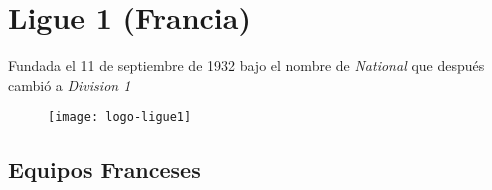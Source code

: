 \section{Ligue 1 (Francia)}

Fundada el 11 de septiembre de 1932 bajo el nombre de \emph{National} que después cambió a \emph{Division 1}

\begin{figure}[!htb]\centering
   \begin {minipage}{0.5\textwidth}
     \texttt{[image: logo-ligue1]}
   \end{minipage}
\end{figure}

\subsection{Equipos Franceses}\label{sec:equipos-fra}
